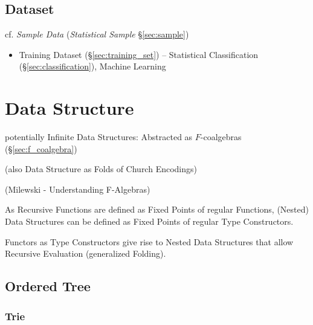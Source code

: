 \subsection{Dataset}\label{sec:dataset}

cf. \emph{Sample Data} (\emph{Statistical Sample} \S\ref{sec:sample})

\begin{itemize}
  \item Training Dataset (\S\ref{sec:training_set}) -- Statistical
    Classification (\S\ref{sec:classification}), Machine Learning
\end{itemize}



\section{Data Structure}\label{sec:data_structure}


potentially Infinite Data Structures: Abstracted as $F$-coalgebras
(\S\ref{sec:f_coalgebra})

(also Data Structure as Folds of Church Encodings)

(Milewski - Understanding F-Algebras)

As Recursive Functions are defined as Fixed Points of regular
Functions, (Nested) Data Structures can be defined as Fixed Points of
regular Type Constructors.

Functors as Type Constructors give rise to Nested Data Structures that
allow Recursive Evaluation (generalized Folding).



\subsection{Ordered Tree}\label{sec:ordered_tree}

\subsubsection{Trie}\label{sec:trie}

